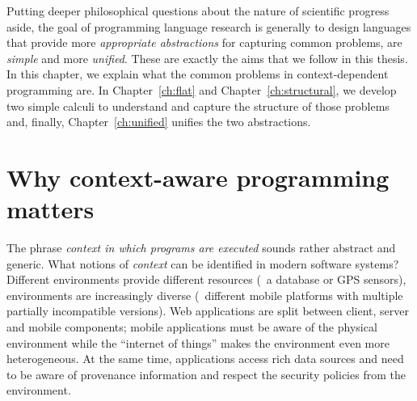Putting deeper philosophical questions about the nature of scientific prog\-ress aside,
the goal of programming language research is generally to design languages that provide
more \emph{appropriate abstractions} for capturing common problems, are \emph{simple} and
more \emph{unified}. These are exactly the aims that we follow in this thesis. In this chapter, 
we explain what the common problems in context-dependent programming are. In 
Chapter~\ref{ch:flat} and Chapter~\ref{ch:structural}, we develop two simple calculi to 
understand and capture the structure of those problems and, finally, Chapter~\ref{ch:unified} 
unifies the two abstractions.



%                                                                                             


\section{Why context-aware programming matters}

The phrase \emph{context in which programs are executed} sounds rather abstract and generic.
What notions of \emph{context} can be identified in modern software systems?
Different environments provide different resources (\eg~a database or GPS sensors), environments 
are increasingly diverse (\eg~different mobile platforms with multiple partially incompatible versions). 
Web applications are split between client, server and mobile components; mobile
applications must be aware of the physical environment while the ``internet of things'' makes
the environment even more heterogeneous. At the same time, applications access
rich data sources and need to be aware of provenance information and respect the security policies 
from the environment.

